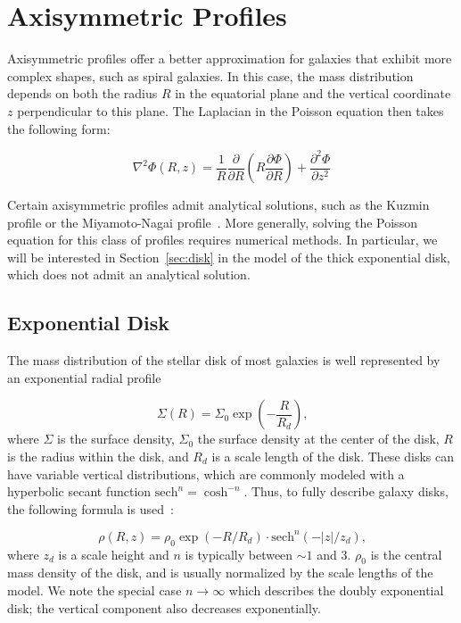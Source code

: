 \section{Axisymmetric Profiles}\label{sec:axisymmetry}

Axisymmetric profiles offer a better approximation for galaxies that exhibit more complex shapes, such as spiral galaxies. In this case, the mass distribution depends on both the radius $R$ in the equatorial plane and the vertical coordinate $z$ perpendicular to this plane. The Laplacian in the Poisson equation then takes the following form:

\begin{equation}
\label{eq:poisson_axisymmetrique}
\nabla^2 \Phi(R, z) = \frac{1}{R}\frac{\partial}{\partial R}\left(R\frac{ \partial \Phi}{\partial R}\right) + \frac{\partial^2\Phi}{\partial z^2}
\end{equation}

Certain axisymmetric profiles admit analytical solutions, such as the Kuzmin profile or the Miyamoto-Nagai profile~\cite{miyamoto1975three}. More generally, solving the Poisson equation for this class of profiles requires numerical methods. In particular, we will be interested in Section~\ref{sec:disk} in the model of the thick exponential disk, which does not admit an analytical solution.

\subsection{Exponential Disk}

The mass distribution of the stellar disk of most galaxies is well represented by an exponential radial profile~\cite{freeman1970disks}

\begin{equation*}
\Sigma(R) = \Sigma_0 \exp{\left(-\frac{R}{R_d}\right)}\text{,}
\end{equation*}
where $\Sigma$ is the surface density, $\Sigma_0$ the surface density at the center of the disk, $R$ is the radius within the disk, and $R_d$ is a scale length of the disk. These disks can have variable vertical distributions, which are commonly modeled with a hyperbolic secant function $\text{sech}^n = \cosh^{-n}$. Thus, to fully describe galaxy disks, the following formula is used~\cite{smith2015simple}:

\begin{equation}
\label{eq:exp_disk_general}
\rho(R, z) = \rho_0 \exp{\left(-R/R_d\right)}\cdot \text{sech}^n\left(-|z|/z_d\right)\text{,}
\end{equation}
where $z_d$ is a  scale height and $n$ is typically between  $\sim 1$ and $3$. $\rho_0$ is the central mass density of the disk, and is usually normalized by the scale lengths of the model. We note the special case $n \rightarrow \infty$ which describes the doubly exponential disk; the vertical component also decreases exponentially.

